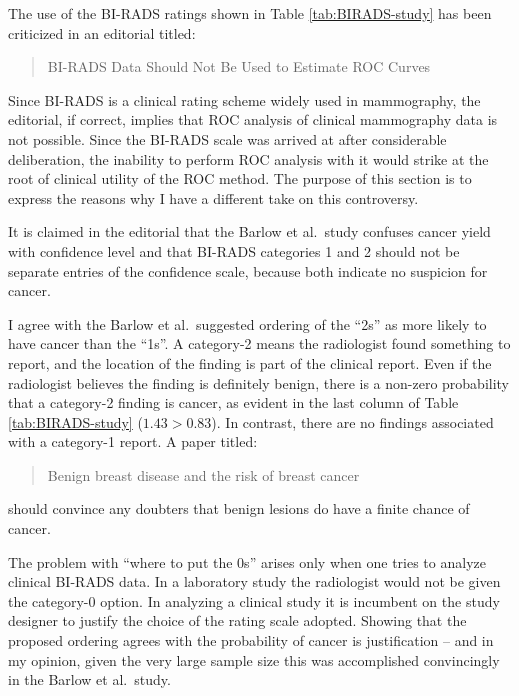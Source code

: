 \documentclass[
]{book}
\begin{document}
The use of the BI-RADS ratings shown in Table \ref{tab:BIRADS-study} has been criticized \citep{RN2166} in an editorial titled:

\begin{quote}
BI-RADS Data Should Not Be Used to Estimate ROC Curves
\end{quote}

Since BI-RADS is a clinical rating scheme widely used in mammography, the editorial, if correct, implies that ROC analysis of clinical mammography data is not possible. Since the BI-RADS scale was arrived at after considerable deliberation, the inability to perform ROC analysis with it would strike at the root of clinical utility of the ROC method. The purpose of this section is to express the reasons why I have a different take on this controversy.

It is claimed in the editorial that the Barlow et al.~study confuses cancer yield with confidence level and that BI-RADS categories 1 and 2 should not be separate entries of the confidence scale, because both indicate no suspicion for cancer.

I agree with the Barlow et al.~suggested ordering of the ``2s'' as more likely to have cancer than the ``1s''. A category-2 means the radiologist found something to report, and the location of the finding is part of the clinical report. Even if the radiologist believes the finding is definitely benign, there is a non-zero probability that a category-2 finding is cancer, as evident in the last column of Table \ref{tab:BIRADS-study} (\(1.43 > 0.83\)). In contrast, there are no findings associated with a category-1 report. A paper \citep{hartmann2005benign} titled:

\begin{quote}
Benign breast disease and the risk of breast cancer
\end{quote}

should convince any doubters that benign lesions do have a finite chance of cancer.

The problem with ``where to put the 0s'' arises only when one tries to analyze clinical BI-RADS data. In a laboratory study the radiologist would not be given the category-0 option. In analyzing a clinical study it is incumbent on the study designer to justify the choice of the rating scale adopted. Showing that the proposed ordering agrees with the probability of cancer is justification -- and in my opinion, given the very large sample size this was accomplished convincingly in the Barlow et al.~study.
\end{document}

